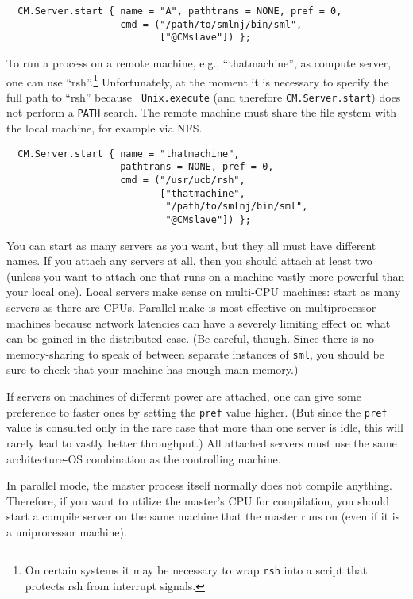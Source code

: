 \documentclass[titlepage,letterpaper]{article}
\begin{document}
\begin{verbatim}
  CM.Server.start { name = "A", pathtrans = NONE, pref = 0,
                    cmd = ("/path/to/smlnj/bin/sml",
                           ["@CMslave"]) };
\end{verbatim}

To run a process on a remote machine, e.g., ``thatmachine'', as
compute server, one can use ``rsh''.\footnote{On certain systems it
may be necessary to wrap {\tt rsh} into a script that protects rsh
from interrupt signals.}  Unfortunately, at the moment it
is necessary to specify the full path to ``rsh'' because {\tt
Unix.execute} (and therefore {\tt CM.Server.start}) does not perform
a {\tt PATH} search. The remote machine
must share the file system with the local machine, for example via NFS.

\begin{verbatim}
  CM.Server.start { name = "thatmachine",
                    pathtrans = NONE, pref = 0,
                    cmd = ("/usr/ucb/rsh",
                           ["thatmachine",
                            "/path/to/smlnj/bin/sml",
                            "@CMslave"]) };
\end{verbatim}

You can start as many servers as you want, but they all must have
different names.  If you attach any servers at all, then you should
attach at least two (unless you want to attach one that runs on a
machine vastly more powerful than your local one).  Local servers make
sense on multi-CPU machines: start as many servers as there are CPUs.
Parallel make is most effective on multiprocessor machines because
network latencies can have a severely limiting effect on what can be
gained in the distributed case.
(Be careful, though.  Since there is no memory-sharing to speak of
between separate instances of {\tt sml}, you should be sure to check
that your machine has enough main memory.)

If servers on machines of different power are attached, one can give
some preference to faster ones by setting the {\tt pref} value higher.
(But since the {\tt pref} value is consulted only in the rare case
that more than one server is idle, this will rarely lead to vastly
better throughput.) All attached servers must use the same
architecture-OS combination as the controlling machine.

In parallel mode, the master process itself normally does not compile
anything.  Therefore, if you want to utilize the master's CPU for
compilation, you should start a compile server on the same machine
that the master runs on (even if it is a uniprocessor machine).
\end{document}
